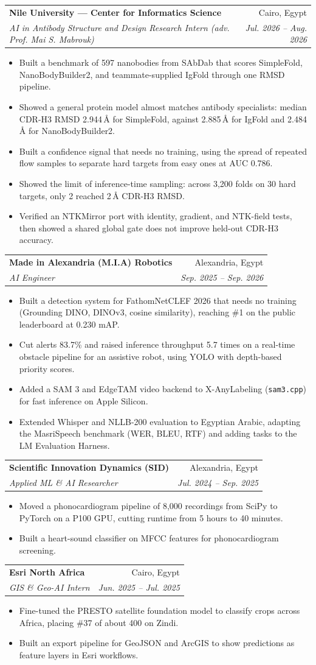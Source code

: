 \documentclass[letterpaper,11pt]{article}
\makeatletter
\newcommand{\resumeBullet}[1]{
  \item\small{#1 \vspace{-2pt}}
}
\newcommand{\resumeSubheading}[4]{
  \vspace{-1pt}\item
    \begin{tabular*}{0.97\textwidth}{l@{\extracolsep{\fill}}r}
      \textbf{#1} & #2 \\
      \textit{\small#3} & \textit{\small #4} \\
    \end{tabular*}\vspace{-5pt}
}
\newcommand{\resumeItemListStart}{\begin{itemize}[leftmargin=*,itemsep=3pt,topsep=3pt]}
\newcommand{\resumeItemListEnd}{\end{itemize}\vspace{-5pt}}
\makeatother
\begin{document}
    \resumeSubheading
      {Nile University --- Center for Informatics Science}{Cairo, Egypt}
      {AI in Antibody Structure and Design Research Intern (adv. Prof. Mai S. Mabrouk)}{Jul. 2026 -- Aug. 2026}
      \resumeItemListStart
        \resumeBullet{Built a benchmark of 597 nanobodies from SAbDab that scores SimpleFold, NanoBodyBuilder2, and teammate-supplied IgFold through one RMSD pipeline.}
        \resumeBullet{Showed a general protein model almost matches antibody specialists: median CDR-H3 RMSD 2.944\,\AA{} for SimpleFold, against 2.885\,\AA{} for IgFold and 2.484\,\AA{} for NanoBodyBuilder2.}
        \resumeBullet{Built a confidence signal that needs no training, using the spread of repeated flow samples to separate hard targets from easy ones at AUC 0.786.}
        \resumeBullet{Showed the limit of inference-time sampling: across 3,200 folds on 30 hard targets, only 2 reached 2\,\AA{} CDR-H3 RMSD.}
        \resumeBullet{Verified an NTKMirror port with identity, gradient, and NTK-field tests, then showed a shared global gate does not improve held-out CDR-H3 accuracy.}
      \resumeItemListEnd

    \resumeSubheading
      {Made in Alexandria (M.I.A) Robotics}{Alexandria, Egypt}
      {AI Engineer}{Sep. 2025 -- Sep. 2026}
      \resumeItemListStart
        \resumeBullet{Built a detection system for FathomNetCLEF 2026 that needs no training (Grounding DINO, DINOv3, cosine similarity), reaching \#1 on the public leaderboard at 0.230 mAP.}
        \resumeBullet{Cut alerts 83.7\% and raised inference throughput 5.7 times on a real-time obstacle pipeline for an assistive robot, using YOLO with depth-based priority scores.}
        \resumeBullet{Added a SAM 3 and EdgeTAM video backend to X-AnyLabeling (\texttt{sam3.cpp}) for fast inference on Apple Silicon.}
        \resumeBullet{Extended Whisper and NLLB-200 evaluation to Egyptian Arabic, adapting the MasriSpeech benchmark (WER, BLEU, RTF) and adding tasks to the LM Evaluation Harness.}
      \resumeItemListEnd

    \resumeSubheading
      {Scientific Innovation Dynamics (SID)}{Alexandria, Egypt}
      {Applied ML \& AI Researcher}{Jul. 2024 -- Sep. 2025}
      \resumeItemListStart
        \resumeBullet{Moved a phonocardiogram pipeline of 8,000 recordings from SciPy to PyTorch on a P100 GPU, cutting runtime from 5 hours to 40 minutes.}
        \resumeBullet{Built a heart-sound classifier on MFCC features for phonocardiogram screening.}
      \resumeItemListEnd

    \resumeSubheading
      {Esri North Africa}{Cairo, Egypt}
      {GIS \& Geo-AI Intern}{Jun. 2025 -- Jul. 2025}
      \resumeItemListStart
        \resumeBullet{Fine-tuned the PRESTO satellite foundation model to classify crops across Africa, placing \#37 of about 400 on Zindi.}
        \resumeBullet{Built an export pipeline for GeoJSON and ArcGIS to show predictions as feature layers in Esri workflows.}
      \resumeItemListEnd
\end{document}
